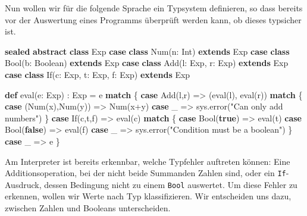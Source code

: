 \documentclass[]{article}
\newenvironment{Shaded}{}{}
\newcommand{\FunctionTok}[1]{\textcolor[rgb]{0.02,0.16,0.49}{#1}}
\newcommand{\KeywordTok}[1]{\textcolor[rgb]{0.00,0.44,0.13}{\textbf{#1}}}
\newcommand{\NormalTok}[1]{#1}
\newcommand{\StringTok}[1]{\textcolor[rgb]{0.25,0.44,0.63}{#1}}
\begin{document}
Nun wollen wir für die folgende Sprache ein Typsystem definieren, so
dass bereits vor der Auswertung eines Programms überprüft werden kann,
ob dieses typsicher ist.

\begin{Shaded}
\begin{Highlighting}[]
\KeywordTok{sealed} \KeywordTok{abstract} \KeywordTok{class}\NormalTok{ Exp}
\KeywordTok{case} \KeywordTok{class} \FunctionTok{Num}\NormalTok{(n: Int) }\KeywordTok{extends}\NormalTok{ Exp}
\KeywordTok{case} \KeywordTok{class} \FunctionTok{Bool}\NormalTok{(b: Boolean) }\KeywordTok{extends}\NormalTok{ Exp}
\KeywordTok{case} \KeywordTok{class} \FunctionTok{Add}\NormalTok{(l: Exp, r: Exp) }\KeywordTok{extends}\NormalTok{ Exp}
\KeywordTok{case} \KeywordTok{class} \FunctionTok{If}\NormalTok{(c: Exp, t: Exp, f: Exp) }\KeywordTok{extends}\NormalTok{ Exp}

\KeywordTok{def} \FunctionTok{eval}\NormalTok{(e: Exp) : Exp = e }\KeywordTok{match}\NormalTok{ \{}
  \KeywordTok{case} \FunctionTok{Add}\NormalTok{(l,r) =\textgreater{} (}\FunctionTok{eval}\NormalTok{(l), }\FunctionTok{eval}\NormalTok{(r)) }\KeywordTok{match}\NormalTok{ \{}
    \KeywordTok{case}\NormalTok{ (}\FunctionTok{Num}\NormalTok{(x),}\FunctionTok{Num}\NormalTok{(y)) =\textgreater{} }\FunctionTok{Num}\NormalTok{(x+y)}
    \KeywordTok{case}\NormalTok{ \_ =\textgreater{} sys.}\FunctionTok{error}\NormalTok{(}\StringTok{"Can only add numbers"}\NormalTok{)}
\NormalTok{  \}}
  \KeywordTok{case} \FunctionTok{If}\NormalTok{(c,t,f) =\textgreater{} }\FunctionTok{eval}\NormalTok{(c) }\KeywordTok{match}\NormalTok{ \{}
    \KeywordTok{case} \FunctionTok{Bool}\NormalTok{(}\KeywordTok{true}\NormalTok{) =\textgreater{} }\FunctionTok{eval}\NormalTok{(t)}
    \KeywordTok{case} \FunctionTok{Bool}\NormalTok{(}\KeywordTok{false}\NormalTok{) =\textgreater{} }\FunctionTok{eval}\NormalTok{(f)}
    \KeywordTok{case}\NormalTok{ \_ =\textgreater{} sys.}\FunctionTok{error}\NormalTok{(}\StringTok{"Condition must be a boolean"}\NormalTok{)}
\NormalTok{  \}}
  \KeywordTok{case}\NormalTok{ \_ =\textgreater{} e}
\NormalTok{\}}
\end{Highlighting}
\end{Shaded}

Am Interpreter ist bereits erkennbar, welche Typfehler auftreten können:
Eine Additionsoperation, bei der nicht beide Summanden Zahlen sind, oder
ein \texttt{If}-Ausdruck, dessen Bedingung nicht zu einem \texttt{Bool}
auswertet. Um diese Fehler zu erkennen, wollen wir Werte nach Typ
klassifizieren. Wir entscheiden uns dazu, zwischen Zahlen und Booleans
unterscheiden.
\end{document}
